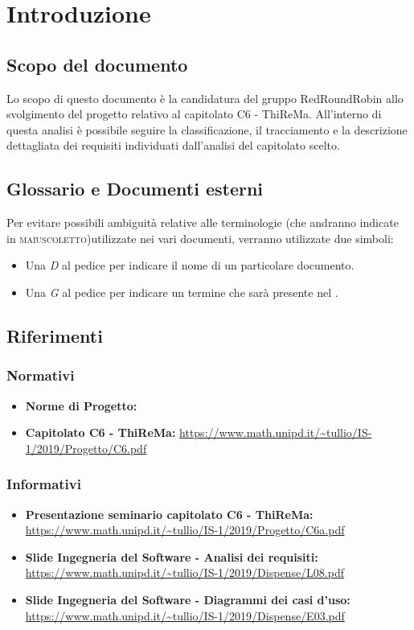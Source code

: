 \section{Introduzione}
	\subsection{Scopo del documento}
		Lo scopo di questo documento è la candidatura del gruppo RedRoundRobin allo svolgimento del progetto relativo al capitolato C6 - ThiReMa.
		All'interno di questa analisi è  possibile seguire la classificazione, il tracciamento e la descrizione dettagliata dei requisiti individuati dall'analisi del capitolato scelto.
	\subsection{Glossario e Documenti esterni}
		Per evitare possibili ambiguità relative alle terminologie (che andranno indicate in \textsc{maiuscoletto})utilizzate nei vari documenti, verranno utilizzate due simboli:
		\begin{itemize}
			\item Una \textit{D} al pedice per indicare il nome di un particolare documento.
			\item Una \textit{G} al pedice per indicare un termine che sarà presente nel .
		\end{itemize}
	\subsection{Riferimenti}
		\subsubsection{Normativi}
			\begin{itemize}
				\item \textbf{Norme di Progetto: } 
				\item \textbf{Capitolato C6 - ThiReMa: }\url{https://www.math.unipd.it/~tullio/IS-1/2019/Progetto/C6.pdf}
			\end{itemize}
		\subsubsection{Informativi}
			\begin{itemize}
				\item \textbf{Presentazione seminario capitolato C6 - ThiReMa: }\url{https://www.math.unipd.it/~tullio/IS-1/2019/Progetto/C6a.pdf}
				\item \textbf{Slide Ingegneria del Software - Analisi dei requisiti: }\url{https://www.math.unipd.it/~tullio/IS-1/2019/Dispense/L08.pdf}
				\item \textbf{Slide Ingegneria del Software - Diagrammi dei casi d'uso: }\url{https://www.math.unipd.it/~tullio/IS-1/2019/Dispense/E03.pdf} 
			\end{itemize}
 